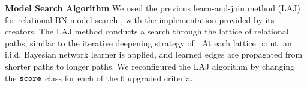 \documentclass{article}
\begin{document}
\begin{table}[tb] \centering
\caption{Datasets characteristics. \#Tuples = total number of tuples over all tables in the dataset. The datasets contain multiple relationships and populations of different types.
  \label{table:datasetsize}}
\end{table}


\noindent\textbf{Model Search Algorithm}
We used the previous learn-and-join method (LAJ) for relational BN model search 
\cite{Schulte2012}, with the  implementation provided by its creators. The LAJ method conducts a search through the lattice of relational paths, similar to the iterative deepening strategy of \cite{friedman1999learning}. At each lattice point, an i.i.d. Bayesian network learner is applied, and learned edges are propagated from shorter paths to longer paths. We reconfigured the LAJ algorithm by changing the $\tt{score}$ class for each of the 6 upgraded criteria. 
\end{document}
